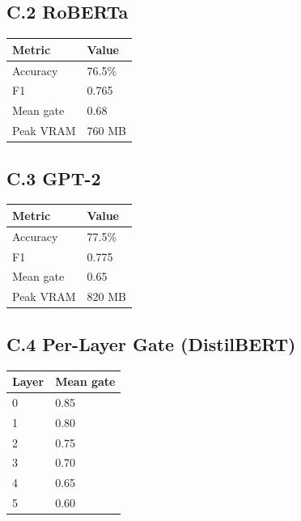 \subsection{C.2 RoBERTa}

\begin{table}[H]
\centering
\small
\begin{tabular}{ll}
\toprule
\textbf{Metric} & \textbf{Value} \\
\midrule
Accuracy & 76.5\% \\
F1 & 0.765 \\
Mean gate & 0.68 \\
Peak VRAM & 760 MB \\
\bottomrule
\end{tabular}
\end{table}

\subsection{C.3 GPT-2}

\begin{table}[H]
\centering
\small
\begin{tabular}{ll}
\toprule
\textbf{Metric} & \textbf{Value} \\
\midrule
Accuracy & 77.5\% \\
F1 & 0.775 \\
Mean gate & 0.65 \\
Peak VRAM & 820 MB \\
\bottomrule
\end{tabular}
\end{table}

\subsection{C.4 Per-Layer Gate (DistilBERT)}

\begin{table}[H]
\centering
\small
\begin{tabular}{ll}
\toprule
\textbf{Layer} & \textbf{Mean gate} \\
\midrule
0 & 0.85 \\
1 & 0.80 \\
2 & 0.75 \\
3 & 0.70 \\
4 & 0.65 \\
5 & 0.60 \\
\bottomrule
\end{tabular}
\end{table}

